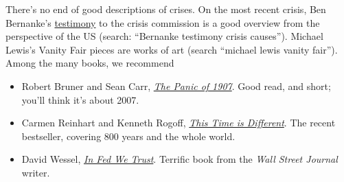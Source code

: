 There's no end of good descriptions of crises.
On the most recent crisis, Ben Bernanke's 
\href{http://www.federalreserve.gov/newsevents/testimony/Bernanke20100902a.htm}
{testimony} to the crisis commission is a good overview
from the perspective of the US
(search:  ``Bernanke
 testimony crisis causes'').
Michael Lewis's Vanity Fair pieces are works of art
(search ``michael lewis vanity fair'').
Among the many books, we recommend
%
\begin{itemize}
\item Robert Bruner and Sean Carr,
\href{http://www.amazon.com/Panic-1907-Lessons-Learned-Markets/dp/0470452587/}
{\it The Panic of 1907\/}.
Good read, and short; you'll think it's about 2007.

\item Carmen Reinhart and Kenneth Rogoff,
\href{http://www.amazon.com/This-Time-Different-Centuries-ebook/dp/B004EYT932/}
{\it This Time is Different\/}.
The recent bestseller, covering 800 years and the whole world.

\item David Wessel,
\href{http://www.amazon.com/Fed-We-Trust-Bernankes-Great/dp/0307459683/}
{\it In Fed We Trust\/}.
Terrific book from the \emph{Wall Street Journal} writer.

\end{itemize}
